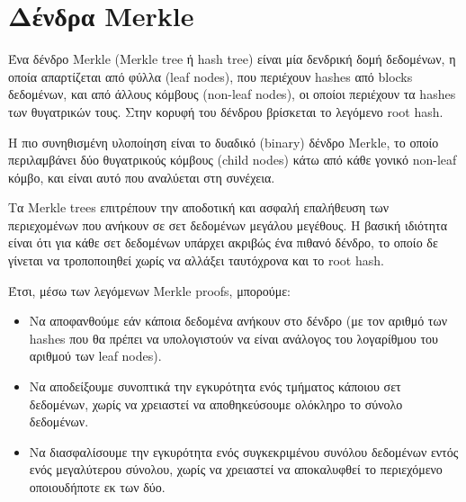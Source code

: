 \section{Δένδρα Merkle}

Ένα δένδρο Merkle (Merkle tree ή hash tree) είναι μία δενδρική δομή δεδομένων, η οποία απαρτίζεται από φύλλα (leaf nodes), που περιέχουν hashes από blocks δεδομένων, και από άλλους κόμβους (non-leaf nodes), οι οποίοι περιέχουν τα hashes των θυγατρικών τους. Στην κορυφή του δένδρου βρίσκεται το λεγόμενο root hash\cite{merkle-tree}.

Η πιο συνηθισμένη υλοποίηση είναι το δυαδικό (binary) δένδρο Merkle, το οποίο περιλαμβάνει δύο θυγατρικούς κόμβους (child nodes) κάτω από κάθε γονικό non-leaf κόμβο, και είναι αυτό που αναλύεται στη συνέχεια.


Τα Merkle trees επιτρέπουν την αποδοτική και ασφαλή επαλήθευση των περιεχομένων που ανήκουν σε σετ δεδομένων μεγάλου μεγέθους. Η βασική ιδιότητα είναι ότι για κάθε σετ δεδομένων υπάρχει ακριβώς ένα πιθανό δένδρο, το οποίο δε γίνεται να τροποποιηθεί χωρίς να αλλάξει ταυτόχρονα και το root hash. 

Έτσι, μέσω των λεγόμενων Merkle proofs, μπορούμε:
\begin{itemize}
	\item Να αποφανθούμε εάν κάποια δεδομένα ανήκουν στο δένδρο (με τον αριθμό των hashes που θα πρέπει να υπολογιστούν να είναι ανάλογος του λογαρίθμου του αριθμού των leaf nodes).
	\item Να αποδείξουμε συνοπτικά την εγκυρότητα ενός τμήματος κάποιου σετ δεδομένων, χωρίς να χρειαστεί να αποθηκεύσουμε ολόκληρο το σύνολο δεδομένων.
	\item Να διασφαλίσουμε την εγκυρότητα ενός συγκεκριμένου συνόλου δεδομένων εντός ενός μεγαλύτερου σύνολου, χωρίς να χρειαστεί να αποκαλυφθεί το περιεχόμενο οποιουδήποτε εκ των δύο\cite{merkle-proofs-explained}. 
\end{itemize}
